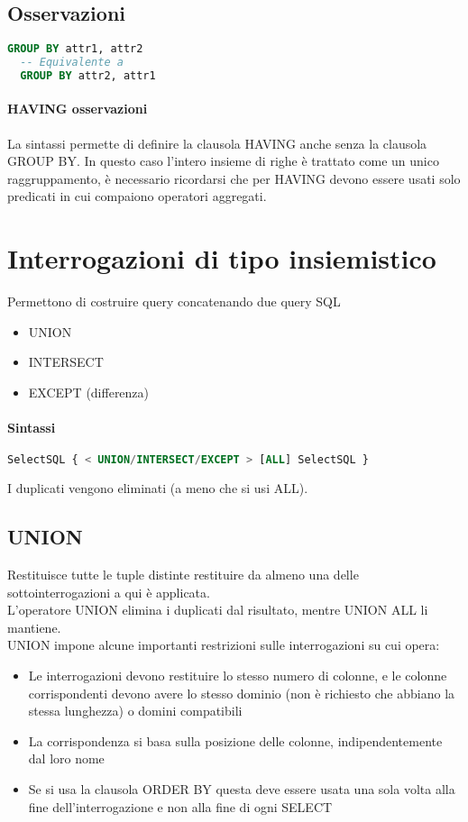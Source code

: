 \subsection{Osservazioni}
\begin{lstlisting}[language=SQL]
  GROUP BY attr1, attr2
  -- Equivalente a
  GROUP BY attr2, attr1
\end{lstlisting}
\paragraph*{HAVING osservazioni}
La sintassi permette di definire la clausola HAVING anche senza la clausola GROUP BY.
In questo caso l'intero insieme di righe è trattato come un unico raggruppamento, è
necessario ricordarsi che per HAVING devono essere usati solo predicati in cui
compaiono operatori aggregati.
\section{Interrogazioni di tipo insiemistico}
Permettono di costruire query concatenando due query SQL
\begin{itemize}
  \item UNION
  \item INTERSECT
  \item EXCEPT (differenza)
\end{itemize}
\paragraph*{Sintassi}
\begin{lstlisting}[language=SQL]
  SelectSQL { < UNION/INTERSECT/EXCEPT > [ALL] SelectSQL }
\end{lstlisting}
I duplicati vengono eliminati (a meno che si usi ALL).
\subsection{UNION}
Restituisce tutte le tuple distinte restituire da almeno una delle sottointerrogazioni a qui
è applicata.\\
L'operatore UNION elimina i duplicati dal risultato, mentre UNION ALL li mantiene.\\
UNION impone alcune importanti restrizioni sulle interrogazioni su cui opera:
\begin{itemize}
  \item Le interrogazioni devono restituire lo stesso numero di colonne, e le colonne corrispondenti devono avere
  lo stesso dominio (non è richiesto che abbiano la stessa lunghezza) o domini compatibili
  \item La corrispondenza si basa sulla posizione delle colonne, indipendentemente dal loro nome
  \item Se si usa la clausola ORDER BY questa deve essere usata una sola volta alla
  fine dell'interrogazione e non alla fine di ogni SELECT
\end{itemize}

